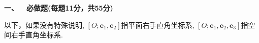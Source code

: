 \newcommand{\e}{\mathbf{e}}
\newcommand{\bs}{\mathbf{S}}

\begin{center}
\end{center}

\textbf{一、\ \ 必做题(每题11分，共55分)}

\qquad 以下，如果没有特殊说明, $[O;\e_1,\e_2]$指平面右手直角坐标系, 
$[O;\e_1,\e_2,\e_3]$指空间右手直角坐标系.
